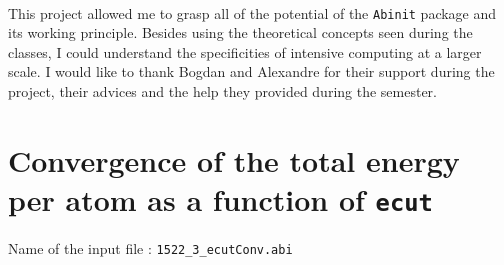 \documentclass[11pt,a4paper]{article}
\begin{document}
\hspace{1cm}\\
This project allowed me to grasp all of the potential of the \texttt{Abinit} package and its working principle. Besides using the theoretical concepts seen during the classes, I could understand the specificities of intensive computing at a larger scale. I would like to thank Bogdan and Alexandre for their support during the project, their advices and the help they provided during the semester. 
\newpage
{}


\newpage
\appendix
\section{Convergence of the total energy per atom as a function of \texttt{ecut}}
\label{Abi1}
Name of the input file : \texttt{1522\_3\_ecutConv.abi}
\end{document}
